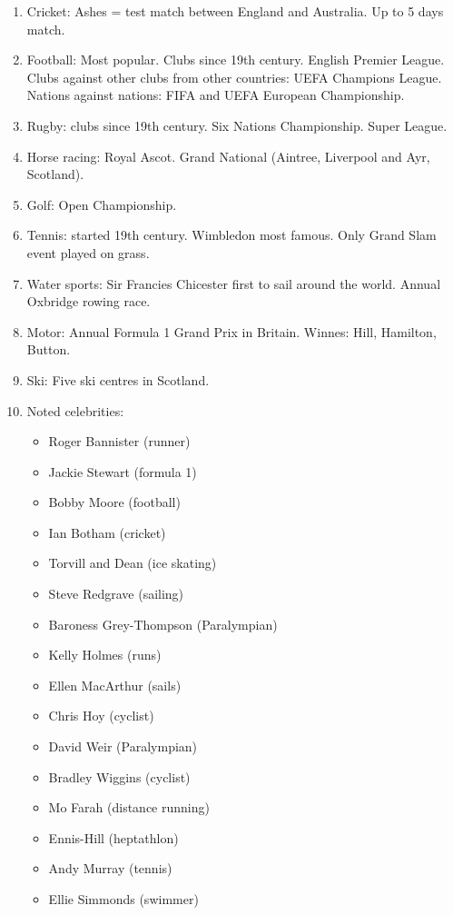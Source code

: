 \documentclass[10pt,reqno]{amsart}
\begin{document}
\begin{enumerate}[i]
\item Cricket: Ashes = test match between England and Australia. Up to 5 days match.
\item Football: Most popular. Clubs since 19th century. English Premier League. Clubs against other clubs from other countries: UEFA Champions League. Nations against nations: FIFA and UEFA European Championship. 
\item Rugby: clubs since 19th century. Six Nations Championship. Super League. 
\item Horse racing: Royal Ascot. Grand National (Aintree, Liverpool and Ayr, Scotland).
\item Golf: Open Championship.
\item Tennis: started 19th century. Wimbledon most famous. Only Grand Slam event played on grass.
\item Water sports: Sir Francies Chicester first to sail around the world. Annual Oxbridge rowing race. 
\item Motor: Annual Formula 1 Grand Prix in Britain. Winnes: Hill, Hamilton, Button. 
\item Ski: Five ski centres in Scotland.
\item Noted celebrities: 
\begin{itemize}
\item Roger Bannister (runner)
\item Jackie Stewart (formula 1)
\item Bobby Moore (football)
\item Ian Botham (cricket)
\item Torvill and Dean (ice skating) 
\item Steve Redgrave (sailing)
\item Baroness Grey-Thompson (Paralympian)
\item Kelly Holmes (runs)
\item Ellen MacArthur (sails)
\item Chris Hoy (cyclist)
\item David Weir (Paralympian)
\item Bradley Wiggins (cyclist)
\item Mo Farah (distance running)
\item Ennis-Hill (heptathlon)
\item Andy Murray (tennis)
\item Ellie Simmonds (swimmer)
\end{itemize}
\end{enumerate}
\end{document}
